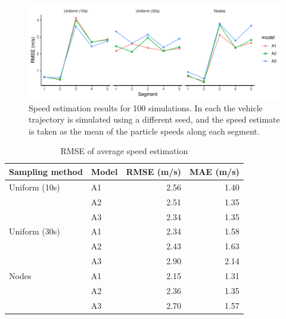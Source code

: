\begin{knitrout}\small
{}\color{fgcolor}\begin{figure}
\includegraphics[width=\maxwidth]{figure/sim2_pf_full-1} \caption[Speed estimation results for 100 simulations]{Speed estimation results for 100 simulations. In each the vehicle trajectory is simulated using a different seed, and the speed estimate is taken as the mean of the particle speeds along each segment.}\label{fig:sim2_pf_full}
\end{figure}

\begin{table}

\caption{\label{tab:sim2_pf_full}RMSE of average speed estimation}
\centering
\fontsize{8}{10}\selectfont
\begin{tabular}[t]{llrr}
\toprule
Sampling method & Model & RMSE (m/s) & MAE (m/s)\\
\midrule
Uniform (10s) & A1 & 2.56 & 1.40\\
 & A2 & 2.51 & 1.35\\
 & A3 & 2.34 & 1.35\\
\midrule
Uniform (30s) & A1 & 2.34 & 1.58\\
 & A2 & 2.43 & 1.63\\
 & A3 & 2.90 & 2.14\\
\midrule
Nodes & A1 & 2.15 & 1.31\\
 & A2 & 2.36 & 1.35\\
 & A3 & 2.70 & 1.57\\
\bottomrule
\end{tabular}
\end{table}


\end{knitrout}







